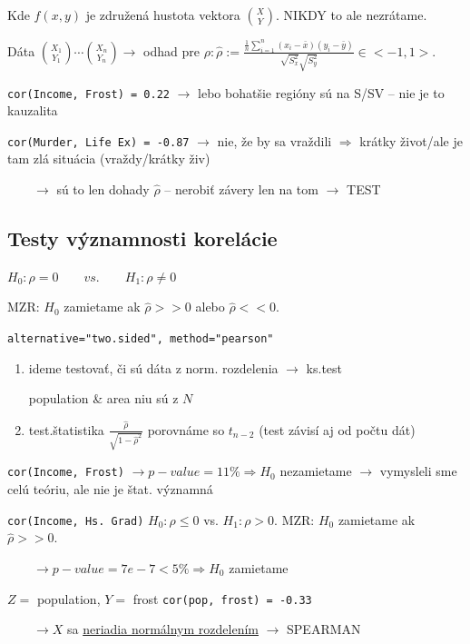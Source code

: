 \documentclass[unknownkeysallowed]{article}
\begin{document}
Kde $f(x,y)$ je združená hustota vektora $\binom{X}{Y}$. NIKDY to ale nezrátame.

Dáta $\binom{X_1}{Y_1} \cdots \binom{X_n}{Y_n} \to$ odhad pre $\rho : \hat{\rho} := \frac{\frac{1}{n}\sum_{i=1}^n{(x_i-\bar{x})(y_i-\bar{y})}}{\sqrt{S_x^2}\sqrt{S_y^2}} \in <-1,1>$.

\texttt{cor(Income, Frost) = 0.22} $\to$ lebo bohatšie regióny sú na S/SV -- nie je to kauzalita

\texttt{cor(Murder, Life Ex) = -0.87} $\to$ nie, že by sa vraždili $\Rightarrow$ krátky život/ale je tam zlá situácia (vraždy/krátky živ)

$\qquad\to$ sú to len dohady $\hat{\rho}$ -- nerobiť závery len na tom $\to$ TEST

\subsection*{Testy významnosti korelácie}
\begin{multicols}{2}

$H_0: \rho = 0 \qquad vs. \qquad H_1: \rho \neq 0$

MZR: $H_0$ zamietame ak $\hat{\rho} >> 0$ alebo $\hat{\rho} << 0$.

\texttt{alternative="two.sided", method="pearson"}

\columnbreak

\begin{enumerate}
\item ideme testovať, či sú dáta z norm. rozdelenia $\to$ ks.test

population \& area niu sú z $N$
\item test.štatistika $\frac{\hat{\rho}}{\sqrt{1-\hat{\rho}^2}}$ porovnáme so $t_{n-2}$ (test závisí aj od počtu dát)
\end{enumerate}

\end{multicols}

\texttt{cor(Income, Frost)} $\to p-value = 11\% \Rightarrow H_0$ nezamietame $\to$ vymysleli sme celú teóriu, ale nie je štat. významná

\texttt{cor(Income, Hs. Grad)} \qquad $H_0: \rho \leq 0$ vs. $H_1: \rho > 0$. MZR: $H_0$ zamietame ak $\hat{\rho} >> 0$.

$\qquad \to p-value = 7e-7 < 5\% \Rightarrow H_0$ zamietame

$Z = $ population, $Y = $ frost \qquad \texttt{cor(pop, frost) = -0.33}

$\qquad \to X$ sa \underline{neriadia normálnym rozdelením} $\to$ SPEARMAN
\end{document}
